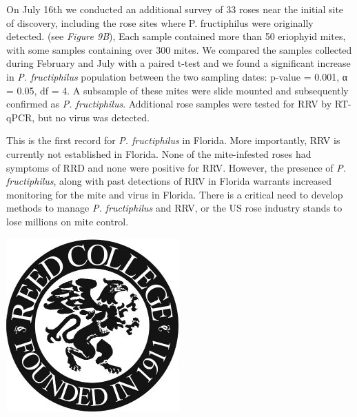 \documentclass[12pt,final,CPage]{ufthesis}
\begin{document}
{  On July 16th we conducted an additional survey of 33 roses near the initial site of discovery, including the rose sites where P. fructiphilus were originally detected. (see \emph{Figure 9B}), Each sample contained more than 50 eriophyid mites, with some samples containing over 300 mites. We compared the samples collected during February and July with a paired t-test and we found a significant increase in \emph{P. fructiphilus} population between the two sampling dates: p-value = 0.001, α = 0.05, df = 4. A subsample of these mites were slide mounted and subsequently confirmed as \emph{P. fructiphilus}. Additional rose samples were tested for RRV by RT-qPCR, but no virus was detected.

  This is the first record for \emph{P. fructiphilus} in Florida. More importantly, RRV is currently not established in Florida. None of the mite-infested roses had symptoms of RRD and none were positive for RRV. However, the presence of \emph{P. fructiphilus}, along with past detections of RRV in Florida warrants increased monitoring for the mite and virus in Florida. There is a critical need to develop methods to manage \emph{P. fructiphilus} and RRV, or the US rose industry stands to lose millions on mite control.
  \begin{center}\includegraphics[width=0.8\linewidth]{figure/reed} \end{center}

}
\end{document}
